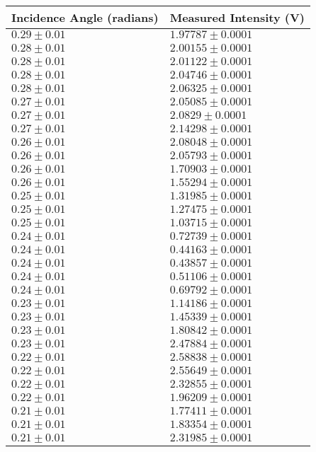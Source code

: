\begin{tabular}{| p{} | p{} |}
\hline
Incidence Angle (radians) & Measured Intensity (V)\\
\hline
$0.29 \pm 0.01$ & $1.97787 \pm 0.0001$\\
$0.28 \pm 0.01$ & $2.00155 \pm 0.0001$\\
$0.28 \pm 0.01$ & $2.01122 \pm 0.0001$\\
$0.28 \pm 0.01$ & $2.04746 \pm 0.0001$\\
$0.28 \pm 0.01$ & $2.06325 \pm 0.0001$\\
$0.27 \pm 0.01$ & $2.05085 \pm 0.0001$\\
$0.27 \pm 0.01$ & $2.0829 \pm 0.0001$\\
$0.27 \pm 0.01$ & $2.14298 \pm 0.0001$\\
$0.26 \pm 0.01$ & $2.08048 \pm 0.0001$\\
$0.26 \pm 0.01$ & $2.05793 \pm 0.0001$\\
$0.26 \pm 0.01$ & $1.70903 \pm 0.0001$\\
$0.26 \pm 0.01$ & $1.55294 \pm 0.0001$\\
$0.25 \pm 0.01$ & $1.31985 \pm 0.0001$\\
$0.25 \pm 0.01$ & $1.27475 \pm 0.0001$\\
$0.25 \pm 0.01$ & $1.03715 \pm 0.0001$\\
$0.24 \pm 0.01$ & $0.72739 \pm 0.0001$\\
$0.24 \pm 0.01$ & $0.44163 \pm 0.0001$\\
$0.24 \pm 0.01$ & $0.43857 \pm 0.0001$\\
$0.24 \pm 0.01$ & $0.51106 \pm 0.0001$\\
$0.24 \pm 0.01$ & $0.69792 \pm 0.0001$\\
$0.23 \pm 0.01$ & $1.14186 \pm 0.0001$\\
$0.23 \pm 0.01$ & $1.45339 \pm 0.0001$\\
$0.23 \pm 0.01$ & $1.80842 \pm 0.0001$\\
$0.23 \pm 0.01$ & $2.47884 \pm 0.0001$\\
$0.22 \pm 0.01$ & $2.58838 \pm 0.0001$\\
$0.22 \pm 0.01$ & $2.55649 \pm 0.0001$\\
$0.22 \pm 0.01$ & $2.32855 \pm 0.0001$\\
$0.22 \pm 0.01$ & $1.96209 \pm 0.0001$\\
$0.21 \pm 0.01$ & $1.77411 \pm 0.0001$\\
$0.21 \pm 0.01$ & $1.83354 \pm 0.0001$\\
$0.21 \pm 0.01$ & $2.31985 \pm 0.0001$\\
\hline
\end{tabular}\\
